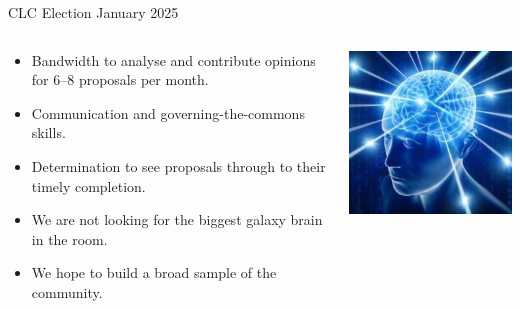 \documentclass[handout]{beamer}
\begin{document}
\begin{frame}{CLC Election January 2025}

\begin{columns}[T]
  \begin{column}{.61\textwidth}

\begin{itemize}[<+->]
\item Bandwidth to analyse and contribute opinions for 6--8 proposals per month.
\item Communication and governing-the-commons skills.
\item Determination to see proposals through to their timely completion.
\item We are not looking for the biggest galaxy brain in the room.
\item We hope to build a broad sample of the community.
\end{itemize}

\end{column}

\begin{column}{.39\textwidth}
  \bigskip\medskip
  \includegraphics[width=\textwidth]{galaxy-brain.jpg}
\end{column}

\end{columns}


\end{frame}
\end{document}
